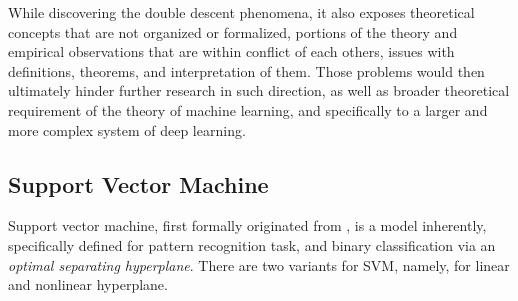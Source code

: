 \documentclass[10pt]{article}
\begin{document}
While discovering the double descent phenomena, it also exposes theoretical concepts that are not organized or formalized, portions of the theory and empirical observations that are within conflict of each others, issues with definitions, theorems, and interpretation of them. Those problems would then ultimately hinder further research in such direction, as well as broader theoretical requirement of the theory of machine learning, and specifically to a larger and more complex system of deep learning. 

\subsection{Support Vector Machine}

Support vector machine, first formally originated from \cite{Vapnik1999-VAPTNO}, is a model inherently, specifically defined for pattern recognition task, and binary classification via an \textit{optimal separating hyperplane}. There are two variants for SVM, namely, for linear and nonlinear hyperplane. 
\end{document}
